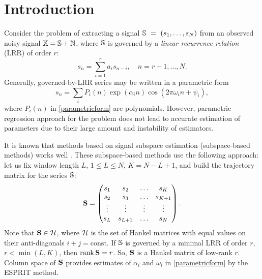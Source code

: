 \documentclass[sii]{ipart}
\def\rank{\mathop{\mathrm{rank}}}
\begin{document}
\begin{frontmatter}

\begin{keyword}
\end{keyword}



\end{frontmatter}

\section{Introduction}
Consider the problem of extracting a signal $\mathbb{S}~=~(s_1, \ldots, s_N)$ from an observed noisy signal $\mathbb{X} = \mathbb{S} + \mathbb{N}$, where $\mathbb{S}$ is governed by a \emph{linear recurrence relation} (LRR) of order $r$:
\begin{equation*}
s_n = \sum_{i = 1}^{r} a_i s_{n-i}, \quad n = r + 1, \ldots, N.
\end{equation*}
Generally, governed-by-LRR series may be written in a parametric form 
\begin{equation} \label{parametricform}
s_n = \sum_i P_i(n) \exp(\alpha_i n) \cos(2 \pi \omega_i n + \psi_i),
\end{equation}
where $P_i(n)$ in \eqref{parametricform} are polynomials. However, parametric regression approach for the problem does not lead to accurate estimation of parameters due to their large amount and instability of estimators.

It is known that methods based on signal subspace estimation (subspace-based methods) works well \cite{Broomhead.King1986, Vautard.etal1992, Elsner.Tsonis1996, Golyandina.etal2001}. These subspace-based methods use the following approach: let us fix window length $L$, $1 \le L \le N$, $K = N - L + 1$, and build the trajectory matrix for the series $\mathbb{S}$:
\begin{equation*}
\bfS = \begin{pmatrix}
s_1 & s_2 & \ldots & s_K \\
s_2 & s_3 & \ldots & s_{K + 1} \\
\vdots & \vdots & \vdots & \vdots \\
s_L & s_{L + 1} & \ldots & s_N
\end{pmatrix}.
\end{equation*}
Note that $\mathbf{S}\in \mathcal{H}$, where $\mathcal{H}$ is the set of Hankel matrices with equal values on their anti-diagonals $i+j=\mathrm{const}$.
If $\mathbb{S}$ is governed by a minimal LRR of order $r$, $r < \min(L, K)$, then $\rank \bfS = r$. So, $\mathbf{S}$ is a Hankel matrix of low-rank $r$. Column space of $\mathbf{S}$ provides estimates of $\alpha_i$ and $\omega_i$ in \eqref{parametricform} by the ESPRIT method.
\end{document}
